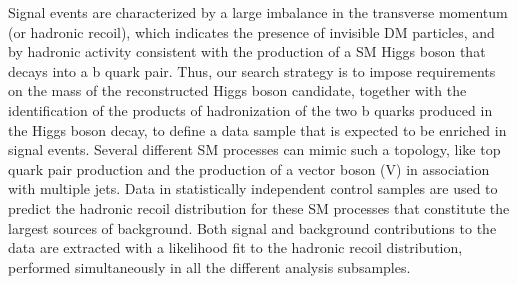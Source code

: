 


Signal events are characterized by a large imbalance in the transverse
momentum (or hadronic recoil), which indicates the presence of invisible
DM particles, and by hadronic activity consistent with the production
of a SM Higgs boson that decays into a b quark pair. Thus, our search
strategy is to impose requirements on the mass of the reconstructed
Higgs boson candidate, together with the identification of the
products of hadronization of the two b quarks produced in the Higgs
boson decay, to define a data sample that is expected to be enriched
in signal events. Several different SM processes can mimic such a topology, like top quark pair production and the production of a vector boson (V) in association with multiple jets. Data in statistically independent control samples are used to predict the hadronic recoil distribution for these SM processes that constitute the largest sources of background.
Both signal and background contributions to the data are extracted with a likelihood fit to the hadronic recoil distribution, performed simultaneously in all the different analysis subsamples.
